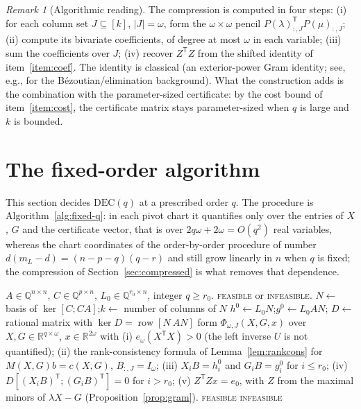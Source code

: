 \documentclass[journal]{IEEEtran}
\theoremstyle{plainn}
\theoremstyle{remark}
\newtheorem{remark}{Remark}
\begin{document}
\begin{remark}[Algorithmic reading]\label{rem:algo}
	The compression is computed in four steps:
	(i) for each column set $J\subseteq[k]$, $|J|=\omega$, form the
	$\omega\times\omega$ pencil $P(\lambda)_{:,J}^{\mathsf T}P(\mu)_{:,J}$;
	(ii) compute its bivariate coefficients, of degree at most $\omega$ in
	each variable;
	(iii) sum the coefficients over $J$;
	(iv) recover $Z^{\mathsf T}Z$ from the shifted identity of
	item~\ref{item:coef}.
	The identity is classical (an exterior-power Gram identity; see, e.g.,
	\cite{emi99} for the B\'ezoutian/elimination background). What the
	construction adds is the combination with the parameter-sized
	certificate: by the cost bound of item~\ref{item:cost}, the certificate
	matrix stays parameter-sized when $q$ is large and $k$ is bounded.
\end{remark}

\section{The fixed-order algorithm}\label{sec:fixedq}

This section decides $\mathrm{DEC}(q)$ at a prescribed order $q$. The procedure
is Algorithm~\ref{alg:fixed-q}: in each pivot chart it quantifies only over the
entries of $X$, $G$ and the certificate vector, that is over
$2q\omega+2\omega=O(q^2)$ real variables, whereas the chart coordinates of the
order-by-order procedure of \cite{fer26b} number $d(m_L-d)=(n-p-q)(q-r)$ and
still grow linearly in $n$ when $q$ is fixed; the compression of
Section~\ref{sec:compressed} is what removes that dependence.

\begin{algorithm}[!t]
\caption{Deciding $\mathrm{DEC}(q)$ for a fixed order $q$}
\label{alg:fixed-q}
\begin{algorithmic}[1]
\Require $A\in\mathbb Q^{n\times n}$, $C\in\mathbb Q^{p\times n}$,
$L_0\in\mathbb Q^{r_0\times n}$, integer $q\ge r_0$.
\Ensure \textsc{feasible} or \textsc{infeasible}.
\State $N\gets$ basis of $\ker[C;CA]$;\quad $k\gets$ number of columns of $N$
\State $h^0\gets L_0N$;\quad $g^0\gets L_0AN$;\quad
$D\gets$ rational matrix with $\ker D=\operatorname{row}[N\ AN]$
    \State form $\Phi_{\omega,J}(X,G,x)$ over $X,G\in\mathbb R^{q\times\omega}$,
           $x\in\mathbb R^{2\omega}$ with
    \Statex \quad (i) $e_\omega(X^{\mathsf T}X)>0$ (the left inverse $U$ is
           not quantified);
    \Statex \quad (ii) the rank-consistency formula of
           Lemma~\ref{lem:rankcons} for $M(X,G)b=c(X,G)$, $B_{:,J}=I_\omega$;
    \Statex \quad (iii) $X_iB=h_i^0$ and $G_iB=g_i^0$ for $i\le r_0$;
    \Statex \quad (iv) $D[(X_iB)^{\mathsf T};(G_iB)^{\mathsf T}]=0$ for
           $i>r_0$;
    \Statex \quad (v) $Z^{\mathsf T}Zx=e_0$, with $Z$ from the maximal minors
           of $\lambda X-G$ (Proposition~\ref{prop:gram}).
      \State \Return \textsc{feasible}
    \EndIf
  \EndFor
\EndFor
\State \Return \textsc{infeasible}
\end{algorithmic}
\end{algorithm}
\end{document}
